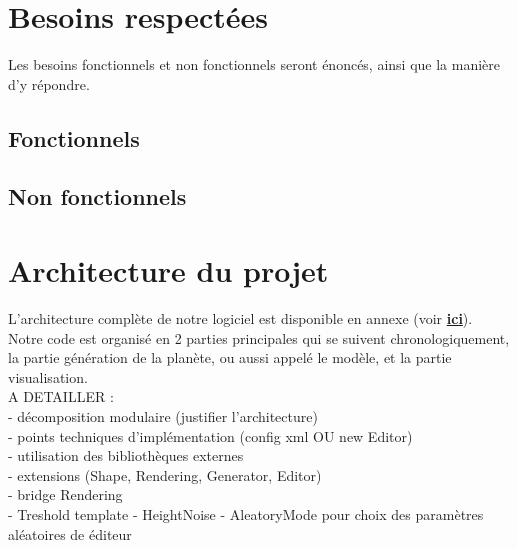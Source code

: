 \documentclass[a4paper]{article}
\begin{document}
\section{Besoins respectées}

Les besoins fonctionnels et non fonctionnels seront énoncés, ainsi que la manière d'y répondre.

\subsection{Fonctionnels}


\subsection{Non fonctionnels}


\section{Architecture du projet}


L'architecture complète de notre logiciel est disponible en annexe (voir \hyperref[archiComplete]{\textbf{ici}}). \\

Notre code est organisé en 2 parties principales qui se suivent chronologiquement, la partie génération de la planète, ou aussi appelé le modèle, et la partie visualisation. \\

A DETAILLER :\\
- décomposition modulaire (justifier l'architecture)\\
- points techniques d’implémentation (config xml OU new Editor)\\
- utilisation des bibliothèques externes\\
- extensions (Shape, Rendering, Generator, Editor)\\
- bridge Rendering\\
- Treshold template
- HeightNoise
- AleatoryMode pour choix des paramètres aléatoires de éditeur
\end{document}
